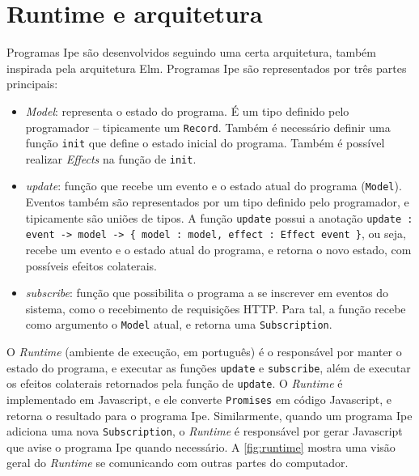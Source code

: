 \section{Runtime e arquitetura}\label{sec:runtime}

Programas Ipe são desenvolvidos seguindo uma certa arquitetura, também inspirada
pela arquitetura Elm. Programas Ipe são representados por três partes principais:

\begin{itemize}
    \item \textit{Model}: representa o estado do programa. É um tipo definido
          pelo programador -- tipicamente um \texttt{Record}. Também é necessário definir
          uma função \texttt{init} que define o estado inicial do programa. Também
          é possível realizar \textit{Effects} na função de \texttt{init}.
    \item \textit{update}: função que recebe um evento e o estado atual do programa
          (\texttt{Model}). Eventos também são representados por um tipo definido pelo
          programador, e tipicamente são uniões de tipos. A função \texttt{update} possui
          a anotação \texttt{update : event -> model -> \{ model : model, effect : Effect event \}},
          ou seja, recebe um evento e o estado atual do programa, e retorna o novo estado,
          com possíveis efeitos colaterais.
    \item \textit{subscribe}: função que possibilita o programa a se inscrever
          em eventos do sistema, como o recebimento de requisições HTTP. Para tal,
          a função recebe como argumento o \texttt{Model} atual, e retorna uma
          \texttt{Subscription}.
\end{itemize}

O \textit{Runtime} (ambiente de execução, em português) é o responsável por manter
o estado do programa, e executar as funções \texttt{update} e \texttt{subscribe},
além de executar os efeitos colaterais retornados pela função de \texttt{update}.
O \textit{Runtime} é implementado em Javascript, e ele converte \texttt{Promises} em
código Javascript, e retorna o resultado para o programa Ipe.  Similarmente, quando
um programa Ipe adiciona uma nova \texttt{Subscription}, o \textit{Runtime} é
responsável por gerar Javascript que avise o programa Ipe quando necessário. A
\autoref{fig:runtime} mostra uma visão geral do \textit{Runtime} se comunicando
com outras partes do computador.


